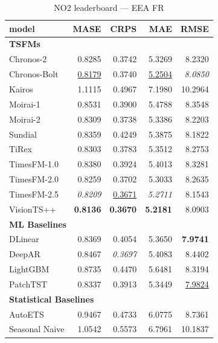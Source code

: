 \begin{table}[H]
\caption{NO2 leaderboard --- EEA FR}
\centering
\begin{small}
\begin{tabular}{lrrrr}
\toprule
model & MASE & CRPS & MAE & RMSE \\
\midrule
\multicolumn{5}{l}{\textbf{TSFMs}} \\
Chronos-2 & 0.8285 & 0.3742 & 5.3269 & 8.2320 \\
Chronos-Bolt & \underline{0.8179} & 0.3740 & \underline{5.2504} & \textit{8.0850} \\
Kairos & 1.1115 & 0.4967 & 7.1980 & 10.2964 \\
Moirai-1 & 0.8531 & 0.3900 & 5.4788 & 8.3548 \\
Moirai-2 & 0.8309 & 0.3738 & 5.3386 & 8.2203 \\
Sundial & 0.8359 & 0.4249 & 5.3875 & 8.1822 \\
TiRex & 0.8303 & 0.3783 & 5.3512 & 8.2753 \\
TimesFM-1.0 & 0.8380 & 0.3924 & 5.4013 & 8.3281 \\
TimesFM-2.0 & 0.8259 & 0.3702 & 5.3033 & 8.2635 \\
TimesFM-2.5 & \textit{0.8209} & \underline{0.3671} & \textit{5.2711} & 8.1543 \\
VisionTS++ & \textbf{0.8136} & \textbf{0.3670} & \textbf{5.2181} & 8.0903 \\
\midrule
\multicolumn{5}{l}{\textbf{ML Baselines}} \\
DLinear & 0.8369 & 0.4054 & 5.3650 & \textbf{7.9741} \\
DeepAR & 0.8467 & \textit{0.3697} & 5.4083 & 8.4402 \\
LightGBM & 0.8735 & 0.4470 & 5.6481 & 8.3194 \\
PatchTST & 0.8337 & 0.3913 & 5.3449 & \underline{7.9824} \\
\midrule
\multicolumn{5}{l}{\textbf{Statistical Baselines}} \\
AutoETS & 0.9467 & 0.4733 & 6.0775 & 8.7361 \\
Seasonal Naive & 1.0542 & 0.5573 & 6.7961 & 10.1837 \\
\bottomrule
\end{tabular}
\end{small}
\end{table}